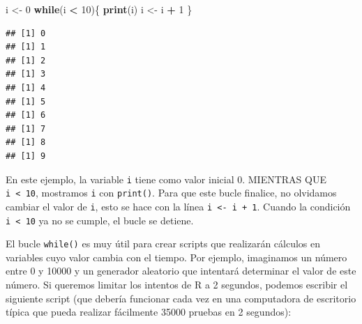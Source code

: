 \documentclass[
]{book}
\newenvironment{Shaded}{\begin{snugshade}}{\end{snugshade}}
\newcommand{\ControlFlowTok}[1]{\textcolor[rgb]{0.13,0.29,0.53}{\textbf{#1}}}
\newcommand{\DecValTok}[1]{\textcolor[rgb]{0.00,0.00,0.81}{#1}}
\newcommand{\KeywordTok}[1]{\textcolor[rgb]{0.13,0.29,0.53}{\textbf{#1}}}
\newcommand{\NormalTok}[1]{#1}
\newcommand{\OperatorTok}[1]{\textcolor[rgb]{0.81,0.36,0.00}{\textbf{#1}}}
\newcommand{\StringTok}[1]{\textcolor[rgb]{0.31,0.60,0.02}{#1}}
\begin{document}
\begin{Shaded}
\begin{Highlighting}[]
\NormalTok{i <-}\StringTok{ }\DecValTok{0}
\ControlFlowTok{while}\NormalTok{(i }\OperatorTok{<}\StringTok{ }\DecValTok{10}\NormalTok{)\{}
  \KeywordTok{print}\NormalTok{(i)}
\NormalTok{  i <-}\StringTok{ }\NormalTok{i }\OperatorTok{+}\StringTok{ }\DecValTok{1}
\NormalTok{\}}
\end{Highlighting}
\end{Shaded}

\begin{verbatim}
## [1] 0
## [1] 1
## [1] 2
## [1] 3
## [1] 4
## [1] 5
## [1] 6
## [1] 7
## [1] 8
## [1] 9
\end{verbatim}

En este ejemplo, la variable \texttt{i} tiene como valor inicial 0. MIENTRAS QUE \texttt{i\ \textless{}\ 10}, mostramos \texttt{i} con \texttt{print()}. Para que este bucle finalice, no olvidamos cambiar el valor de \texttt{i}, esto se hace con la línea \texttt{i\ \textless{}-\ i\ +\ 1}. Cuando la condición \texttt{i\ \textless{}\ 10} ya no se cumple, el bucle se detiene.

El bucle \texttt{while()} es muy útil para crear scripts que realizarán cálculos en variables cuyo valor cambia con el tiempo. Por ejemplo, imaginamos un número entre 0 y 10000 y un generador aleatorio que intentará determinar el valor de este número. Si queremos limitar los intentos de R a 2 segundos, podemos escribir el siguiente script (que debería funcionar cada vez en una computadora de escritorio típica que pueda realizar fácilmente 35000 pruebas en 2 segundos):
\end{document}
